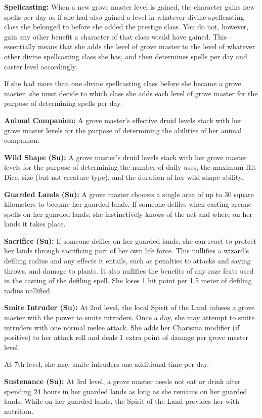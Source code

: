 {
\textbf{Spellcasting:} When a new grove master level is gained, the character gains new spells per day as if she had also gained a level in whatever divine spellcasting class she belonged to before she added the prestige class. You do not, however, gain any other benefit a character of that class would have gained. This essentially means that she adds the level of grove master to the level of whatever other divine spellcasting class she has, and then determines spells per day and caster level accordingly.

If she had more than one divine spellcasting class before she became a grove master, she must decide to which class she adds each level of grove master for the purpose of determining spells per day.

\textbf{Animal Companion:} A grove master's effective druid levels stack with her grove master levels for the purpose of determining the abilities of her animal companion.

\textbf{Wild Shape (Su):} A grove master's druid levels stack with her grove master levels for the purpose of determining the number of daily uses, the maximum Hit Dice, size (but not creature type), and the duration of her wild shape ability.

\textbf{Guarded Lands (Su):} A grove master chooses a single area of up to 30 square kilometers to become her guarded lands. If someone defiles when casting arcane spells on her guarded lands, she instinctively knows of the act and where on her lands it takes place.

\textbf{Sacrifice (Su):} If someone defiles on her guarded lands, she can react to protect her lands through sacrificing part of her own life force. This nullifies a wizard's defiling radius and any effects it entails, such as penalties to attacks and saving throws, and damage to plants. It also nullifies the benefits of any raze feats used in the casting of the defiling spell. She loses 1 hit point per 1.5 meter of defiling radius nullified.

\textbf{Smite Intruder (Su):} At 2nd level, the local Spirit of the Land infuses a grove master with the power to smite intruders. Once a day, she may attempt to smite intruders with one normal melee attack. She adds her Charisma modifier (if positive) to her attack roll and deals 1 extra point of damage per grove master level.

At 7th level, she may smite intruders one additional time per day.

\textbf{Sustenance (Su):} At 3rd level, a grove master needs not eat or drink after spending 24 hours in her guarded lands as long as she remains on her guarded lands. While on her guarded lands, the Spirit of the Land provides her with nutrition. 

}
